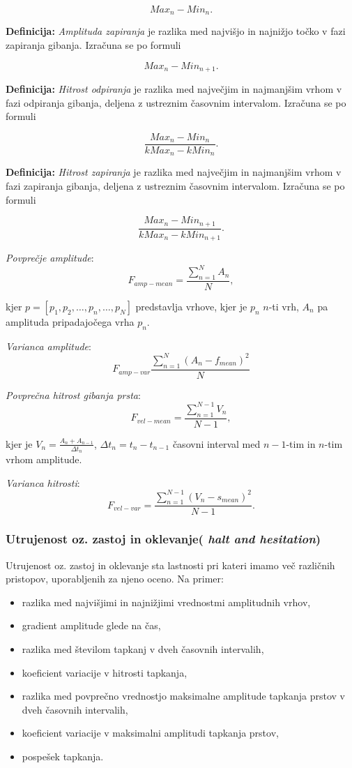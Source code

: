 \documentclass[
]{article}
\providecommand{\tightlist}{%
  \setlength{\itemsep}{0pt}\setlength{\parskip}{0pt}}
\begin{document}
\[
Max_n-Min_n.
\]

\textbf{Definicija:} \emph{Amplituda zapiranja} je razlika med najvišjo
in najnižjo točko v fazi zapiranja gibanja. Izračuna se po formuli

\[
Max_n-Min_{n+1}.
\]

\textbf{Definicija:} \emph{Hitrost odpiranja} je razlika med največjim
in najmanjšim vrhom v fazi odpiranja gibanja, deljena z ustreznim
časovnim intervalom. Izračuna se po formuli

\[
\frac{Max_n-Min_n}{kMax_n-kMin_n}.
\]

\textbf{Definicija:} \emph{Hitrost zapiranja} je razlika med največjim
in najmanjšim vrhom v fazi zapiranja gibanja, deljena z ustreznim
časovnim intervalom. Izračuna se po formuli

\[
\frac{Max_n-Min_{n+1}}{kMax_n-kMin_{n+1}}.
\]

\emph{Povprečje amplitude}: \[
F_{amp - mean} = \frac{\sum_{n=1}^{N}A_n}{N},
\]

kjer \(p = [p_1, p_2, \dots, p_n, \dots, p_N]\) predstavlja vrhove, kjer
je \(p_n\) \(n\)-ti vrh, \(A_n\) pa amplituda pripadajočega vrha
\(p_n\).

\emph{Varianca amplitude}: \[
F_{amp - var}\frac{\sum_{n=1}^{N}(A_n - f_{mean})^2}{N}
\]

\emph{Povprečna hitrost gibanja prsta}: \[
F_{vel - mean} = \frac{\sum_{n=1}^{N-1}V_n}{N-1},
\]

kjer je \(V_n = \frac{A_n + A_{n-1}}{\Delta t_n}\),
\(\Delta t_n = t_n - t_{n-1}\) časovni interval med \(n-1\)-tim in
\(n\)-tim vrhom amplitude.

\emph{Varianca hitrosti}: \[
F_{vel - var} = \frac{\sum_{n=1}^{N-1}(V_n - s_{mean})^2}{N-1}.
\]

\subsubsection{\texorpdfstring{Utrujenost oz. zastoj in oklevanje(
\emph{halt and
hesitation})}{Utrujenost oz. zastoj in oklevanje( halt and hesitation)}}\label{utrujenost-oz.-zastoj-in-oklevanje-halt-and-hesitation}

Utrujenost oz. zastoj in oklevanje sta lastnosti pri kateri imamo več
različnih pristopov, uporabljenih za njeno oceno. Na primer:

\begin{itemize}
\tightlist
\item
  razlika med najvišjimi in najnižjimi vrednostmi amplitudnih vrhov,
\item
  gradient amplitude glede na čas,
\item
  razlika med številom tapkanj v dveh časovnih intervalih,
\item
  koeficient variacije v hitrosti tapkanja,
\item
  razlika med povprečno vrednostjo maksimalne amplitude tapkanja prstov
  v dveh časovnih intervalih,
\item
  koeficient variacije v maksimalni amplitudi tapkanja prstov,
\item
  pospešek tapkanja.
\end{itemize}
\end{document}
